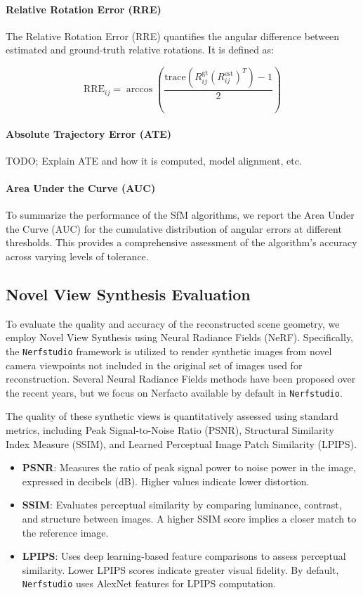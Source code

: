 \paragraph{Relative Rotation Error (RRE)}
The Relative Rotation Error (RRE) quantifies the angular difference between estimated and ground-truth relative rotations. It is defined as:

\begin{equation}
    \text{RRE}_{ij} = \arccos\left(\frac{\text{trace}(R_{ij}^{\text{gt}} (R_{ij}^{\text{est}})^T) - 1}{2}\right)
\end{equation}

\paragraph{Absolute Trajectory Error (ATE)}
TODO; Explain ATE and how it is computed, model alignment, etc.

\paragraph{Area Under the Curve (AUC)}

To summarize the performance of the SfM algorithms, we report the Area Under the Curve (AUC) for the cumulative distribution of angular errors at different thresholds. 
This provides a comprehensive assessment of the algorithm's accuracy across varying levels of tolerance.


\subsection{Novel View Synthesis Evaluation}
To evaluate the quality and accuracy of the reconstructed scene geometry, we employ Novel View Synthesis using Neural Radiance Fields (NeRF). 
Specifically, the \texttt{Nerfstudio} \cite{nerfstudio} framework is utilized to render synthetic images from novel camera viewpoints not included in the original set of images used for reconstruction. 
Several Neural Radiance Fields methods have been proposed over the recent years, but we focus on Nerfacto available by default in \texttt{Nerfstudio}.

The quality of these synthetic views is quantitatively assessed using standard metrics, including Peak Signal-to-Noise Ratio (PSNR), Structural Similarity Index Measure (SSIM), and Learned Perceptual Image Patch Similarity (LPIPS). 

\begin{itemize}
    \item \textbf{PSNR}: Measures the ratio of peak signal power to noise power in the image, expressed in decibels (dB). Higher values indicate lower distortion.
    \item \textbf{SSIM}: Evaluates perceptual similarity by comparing luminance, contrast, and structure between images. A higher SSIM score implies a closer match to the reference image.
    \item \textbf{LPIPS}: Uses deep learning-based feature comparisons to assess perceptual similarity. Lower LPIPS scores indicate greater visual fidelity. By default, \texttt{Nerfstudio} uses AlexNet features for LPIPS computation.
\end{itemize}

